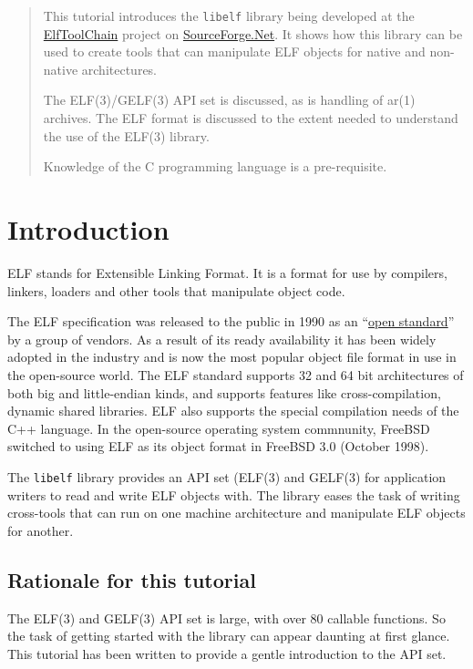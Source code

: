 \documentclass[a4paper]{report}
\newcommand{\library}[1]{\texttt{#1}}
\begin{document}
\lstset{language=C,basicstyle=\small,escapechar=@,float}

\begin{abstract}
This tutorial introduces the \library{libelf} library being developed
at the \href{http://elftoolchain.sourceforge.net/}{ElfToolChain}
project on \href{sourceforge.net}{SourceForge.Net}.  It shows how this
library can be used to create tools that can manipulate ELF objects
for native and non-native architectures.

The ELF(3)/GELF(3) API set is discussed, as is handling of ar(1)
archives.  The ELF format is discussed to the extent needed to
understand the use of the ELF(3) library.

Knowledge of the C programming language is a pre-requisite.
\end{abstract}

\chapter{Introduction}
ELF  stands for Extensible Linking Format.  It
is a format for use by compilers, linkers, loaders and other tools
that manipulate object code.

The ELF specification was released to the public in 1990 as an
``\href{http://www.x86.org/ftp/manuals/tools/elf.pdf}{open standard}''
by a group of vendors.  As a result of its ready availability it has
been widely adopted in the industry and is now the most popular object
file format in use in the open-source world.  The ELF standard
supports 32 and 64 bit architectures of both big and little-endian
kinds, and supports features like cross-compilation, dynamic shared
libraries.  ELF also supports the special compilation needs of the C++
language.  In the open-source operating system commnunity, FreeBSD
switched to using ELF as its object format in FreeBSD 3.0 (October
1998).

The \library{libelf} library provides an API set (ELF(3) and
GELF(3) for application writers to read and write ELF
objects with.  The library eases the task of writing cross-tools
that can run on one machine architecture and manipulate ELF
objects for another.

\section*{Rationale for this tutorial}
The ELF(3) and GELF(3) API set is large, with over 80 callable
functions.  So the task of getting started with the library can appear
daunting at first glance.  This tutorial has been written to provide a
gentle introduction to the API set.
\end{document}
